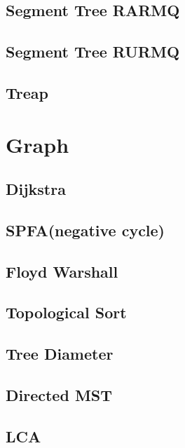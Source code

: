     \subsection{Segment Tree RARMQ}
        
    \subsection{Segment Tree RURMQ}
        
    \subsection{Treap}
        

\section{Graph}
    \subsection{Dijkstra}
        
    \subsection{SPFA(negative cycle)}
        
    \subsection{Floyd Warshall}
        
    \subsection{Topological Sort}
        
    \subsection{Tree Diameter}
        
    \subsection{Directed MST}
        
    \subsection{LCA}
        
